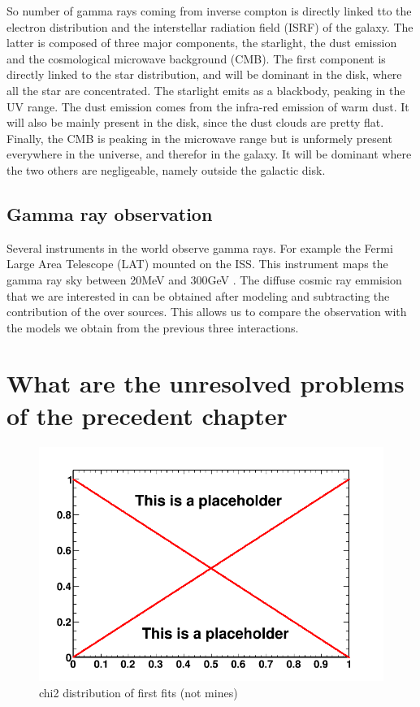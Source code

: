 So number of gamma rays coming from inverse compton is directly linked tto the electron distribution and the interstellar radiation field (ISRF) of the galaxy. The latter is composed of three major components, the starlight, the dust emission and the cosmological microwave background (CMB). The first component is directly linked to the star distribution, and will be dominant in the disk, where all the star are concentrated. The starlight emits as a blackbody, peaking in the UV range. The dust emission comes from the infra-red emission of warm dust. It will also be mainly present in the disk, since the dust clouds are pretty flat. Finally, the CMB is peaking in the microwave range but is unformely present everywhere in the universe, and therefor in the galaxy. It will be dominant where the two others are negligeable, namely outside the galactic disk.


\subsection{Gamma ray observation}

Several instruments in the world observe gamma rays. For example the Fermi Large Area Telescope (LAT) mounted on the ISS. This instrument maps the gamma ray sky between 20MeV and 300GeV . The diffuse cosmic ray emmision that we are interested in can be obtained after modeling and subtracting the contribution of the over sources. This allows us to compare the observation with the models we obtain from the previous three interactions.



\section{What are the unresolved problems of the precedent chapter}
%

\begin{figure}
 \centering
 \includegraphics[width=.9\linewidth]{pic/dummy.png}
 \caption{chi2 distribution of first fits (not mines)}
 \label{fig:first_BKGonly_fits}
\end{figure}

